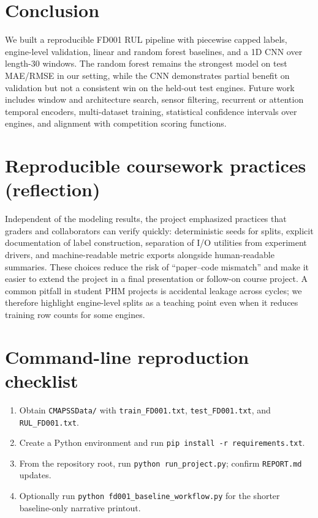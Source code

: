 \documentclass[11pt]{article}
\begin{document}
\section{Conclusion}

We built a reproducible FD001 RUL pipeline with piecewise capped labels, engine-level validation, linear and random forest baselines, and a 1D CNN over length-30 windows. The random forest remains the strongest model on test MAE/RMSE in our setting, while the CNN demonstrates partial benefit on validation but not a consistent win on the held-out test engines. Future work includes window and architecture search, sensor filtering, recurrent or attention temporal encoders, multi-dataset training, statistical confidence intervals over engines, and alignment with competition scoring functions.

\section*{Reproducible coursework practices (reflection)}
Independent of the modeling results, the project emphasized practices that graders and collaborators can verify quickly: deterministic seeds for splits, explicit documentation of label construction, separation of I/O utilities from experiment drivers, and machine-readable metric exports alongside human-readable summaries. These choices reduce the risk of ``paper--code mismatch'' and make it easier to extend the project in a final presentation or follow-on course project. A common pitfall in student PHM projects is accidental leakage across cycles; we therefore highlight engine-level splits as a teaching point even when it reduces training row counts for some engines.

\appendix
\section{Command-line reproduction checklist}
\begin{enumerate}
  \item Obtain \texttt{CMAPSSData/} with \texttt{train\_FD001.txt}, \texttt{test\_FD001.txt}, and \texttt{RUL\_FD001.txt}.
  \item Create a Python environment and run \texttt{pip install -r requirements.txt}.
  \item From the repository root, run \texttt{python run\_project.py}; confirm \texttt{REPORT.md} updates.
  \item Optionally run \texttt{python fd001\_baseline\_workflow.py} for the shorter baseline-only narrative printout.
\end{enumerate}
\end{document}
